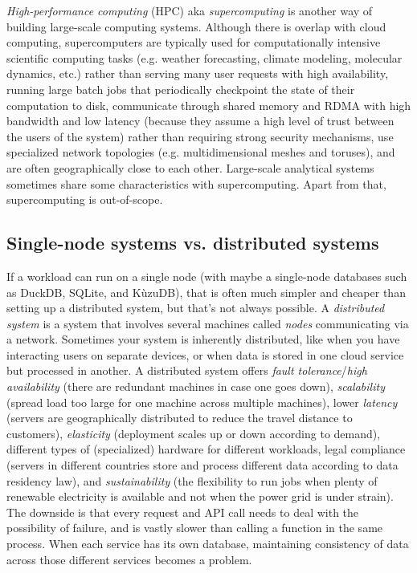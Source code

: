 \documentclass[table, xcdraw]{article}%
\begin{document}
\textit{High-performance computing} (HPC) aka \textit{supercomputing} is another way of building large-scale computing systems. Although there is overlap with cloud computing, supercomputers are typically used for computationally intensive scientific computing tasks (e.g. weather forecasting, climate modeling, molecular dynamics, etc.) rather than serving many user requests with high availability, running large batch jobs that periodically checkpoint the state of their computation to disk, communicate through shared memory and RDMA with high bandwidth and low latency (because they assume a high level of trust between the users of the system) rather than requiring strong security mechanisms, use specialized network topologies (e.g. multidimensional meshes and toruses), and are often geographically close to each other. Large-scale analytical systems sometimes share some characteristics with supercomputing. Apart from that, supercomputing is out-of-scope.

\subsection{Single-node systems vs. distributed systems}

If a workload can run on a single node (with maybe a single-node databases such as DuckDB, SQLite, and KùzuDB), that is often much simpler and cheaper than setting up a distributed system, but that's not always possible. A \textit{distributed system} is a system that involves several machines called \textit{nodes} communicating via a network. Sometimes your system is inherently distributed, like when you have interacting users on separate devices, or when data is stored in one cloud service but processed in another. A distributed system offers \textit{fault tolerance}/\textit{high availability} (there are redundant machines in case one goes down), \textit{scalability} (spread load too large for one machine across multiple machines), lower \textit{latency} (servers are geographically distributed to reduce the travel distance to customers), \textit{elasticity} (deployment scales up or down according to demand), different types of (specialized) hardware for different workloads, legal compliance (servers in different countries store and process different data according to data residency law), and \textit{sustainability} (the flexibility to run jobs when plenty of renewable electricity is available and not when the power grid is under strain). The downside is that every request and API call needs to deal with the possibility of failure, and is vastly slower than calling a function in the same process. When each service has its own database, maintaining consistency of data across those different services becomes a problem.
\end{document}
